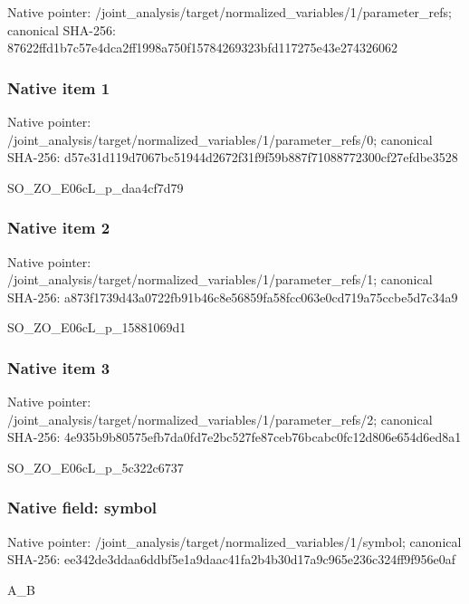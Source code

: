 \documentclass[10pt,a4paper]{article}
\begin{document}
Native pointer: /joint\_analysis/target/n\allowbreak{}ormalized\_variables/1/pa\allowbreak{}rameter\_refs; canonical SHA-256: 87622ffd1b7c57e4dca2ff19\allowbreak{}98a750f15784269323bfd117\allowbreak{}275e43e274326062



\subsubsection{Native item 1}


Native pointer: /joint\_analysis/target/n\allowbreak{}ormalized\_variables/1/pa\allowbreak{}rameter\_refs/0; canonical SHA-256: d57e31d119d7067bc51944d2\allowbreak{}672f31f9f59b887f71088772\allowbreak{}300cf27efdbe3528


SO\_ZO\_E06cL\_p\_daa4cf7d79


\subsubsection{Native item 2}


Native pointer: /joint\_analysis/target/n\allowbreak{}ormalized\_variables/1/pa\allowbreak{}rameter\_refs/1; canonical SHA-256: a873f1739d43a0722fb91b46\allowbreak{}c8e56859fa58fcc063e0cd71\allowbreak{}9a75ccbe5d7c34a9


SO\_ZO\_E06cL\_p\_15881069d1


\subsubsection{Native item 3}


Native pointer: /joint\_analysis/target/n\allowbreak{}ormalized\_variables/1/pa\allowbreak{}rameter\_refs/2; canonical SHA-256: 4e935b9b80575efb7da0fd7e\allowbreak{}2bc527fe87ceb76bcabc0fc1\allowbreak{}2d806e654d6ed8a1


SO\_ZO\_E06cL\_p\_5c322c6737


\subsubsection{Native field: symbol}


Native pointer: /joint\_analysis/target/n\allowbreak{}ormalized\_variables/1/sy\allowbreak{}mbol; canonical SHA-256: ee342de3ddaa6ddbf5e1a9da\allowbreak{}ac41fa2b4b30d17a9c965e23\allowbreak{}6c324ff9f956e0af


A\_B
\end{document}
